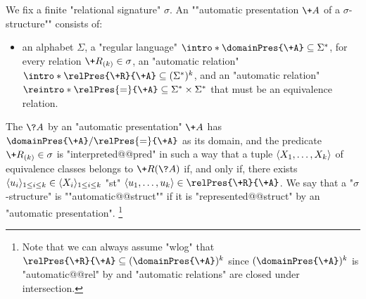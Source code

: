 We fix a finite "relational signature" $\sigma$.
An \AP""automatic presentation $\+A$ of a $\sigma$-structure"" consists of:
\begin{itemize}
	\item an alphabet $\Sigma$,
	\itemAP a "regular language" $\intro*\domainPres{\+A} \subseteq \Sigma^*$,
	\itemAP for every relation $\+R_{(k)} \in \sigma$, an
		"automatic relation" $\intro*\relPres{\+R}{\+A} \subseteq (\Sigma^*)^k$, and
	\itemAP an "automatic relation" $\reintro*\relPres{=}{\+A} \subseteq
		\Sigma^* \times \Sigma^*$ that must be an equivalence relation. 
\end{itemize} 
The \AP{} $\?A$ by an "automatic presentation" $\+A$ has
$\domainPres{\+A}/{\relPres{=}{\+A}}$ as its domain, and the predicate $\+R_{(k)} \in \sigma$
is "interpreted@@pred" in such a way that a tuple $\langle X_1,\hdots,X_k\rangle$ of equivalence classes
belongs to $\+R(\?A)$ if, and only if, there exists $\langle u_i\rangle_{1 \leq i \leq k} \in\langle X_i\rangle_{1 \leq i \leq k}$ "st" $\tup{u_1,\hdots,u_k} \in \relPres{\+R}{\+A}$.
We say that a "$\sigma$-structure" is ""automatic@@struct"" if it is
"represented@@struct" by an "automatic presentation".%
\footnote{Note that we can always assume "wlog" that $\relPres{\+R}{\+A} \subseteq
(\domainPres{\+A})^k$ since $(\domainPres{\+A})^k$ is "automatic@@rel" by
 and "automatic relations" are closed under intersection.}

